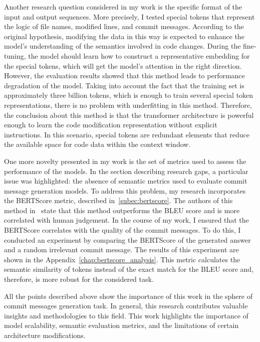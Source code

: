 Another research question considered in my work is the specific format of the input and output sequences. More precisely, I tested special tokens that represent the logic of file names, modified lines, and commit messages. According to the original hypothesis, modifying the data in this way is expected to enhance the model's understanding of the semantics involved in code changes. During the fine-tuning, the model should learn how to construct a representative embedding for the special tokens, which will get the model's attention in the right direction. However, the evaluation results showed that this method leads to performance degradation of the model. Taking into account the fact that the training set is approximately three billion tokens, which is enough to train several special token representations, there is no problem with underfitting in this method. Therefore, the conclusion about this method is that the transformer architecture is powerful enough to learn the code modification representation without explicit instructions. In this scenario, special tokens are redundant elements that reduce the available space for code data within the context window.

One more novelty presented in my work is the set of metrics used to assess the performance of the models. In the section describing research gaps, a particular issue was highlighted: the absence of semantic metrics used to evaluate commit message generation models. To address this problem, my research incorporates the BERTScore metric, described in~\ref{subec:bertscore}. The authors of this method in~\cite{zhang2019bertscore} state that this method outperforms the BLEU score and is more correlated with human judgement. In the course of my work, I ensured that the BERTScore correlates with the quality of the commit messages. To do this, I conducted an experiment by comparing the BERTScore of the generated answer and a random irrelevant commit message. The results of this experiment are shown in the Appendix~\ref{chap:bertscore_analysis}. This metric calculates the semantic similarity of tokens instead of the exact match for the BLEU score and, therefore, is more robust for the considered task.

All the points described above show the importance of this work in the sphere of commit messages generation task. In general, this research contributes valuable insights and methodologies to this field. This work highlights the importance of model scalability, semantic evaluation metrics, and the limitations of certain architecture modifications.

